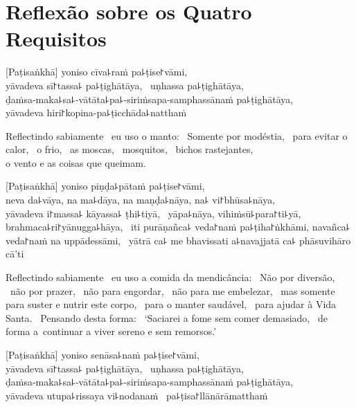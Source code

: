 \chapter[Quatro Requisitos]{Reflexão sobre os Quatro Requisitos}


\begin{leader}
\end{leader}

[Paṭisaṅkhā] yoniso cīva꜕raṁ pa꜕ṭise꜓vāmi, \pause\\
yāvadeva sī꜓tassa꜕ pa꜕ṭighātāya, \pause\ uṇhassa pa꜕ṭighātāya, \pause\\
ḍaṁsa-maka꜕sa꜕-vātāta꜕pa꜕-siriṁsapa-samphassānaṁ pa꜕ṭighātāya, \pause\\
yāvadeva hiri꜓kopina-pa꜕ṭicchāda꜕natthaṁ

\begin{english}
  Reflectindo sabiamente \pause\ eu uso o manto: \pause\ Somente por modéstia, \pause\
  para evitar o calor, \pause\ o frio, \pause\ as moscas, \pause\ mosquitos,
  \pause\ bichos rastejantes, \pause\\ o vento e as coisas que queimam.
\end{english}

[Paṭisaṅkhā] yoniso piṇḍa꜕pātaṁ pa꜕ṭise꜓vāmi, \pause\\
neva da꜕vāya, na ma꜕dāya, na maṇḍa꜕nāya, na꜕ vi꜓bhūsa꜕nāya, \pause\\
yāvadeva i꜓massa꜕ kāyassa꜕ ṭhi꜕tiyā, \pause\ yāpa꜕nāya, vihiṁsū꜕para꜓ti꜕yā, \pause\\
brahmaca꜕ri꜓yānugga꜕hāya, \pause\ iti purāṇañca꜕ veda꜓naṁ pa꜕ṭiha꜓ṅkhāmi,
navañca꜕ veda꜓naṁ na uppādessāmi, \pause\ yātrā ca꜕ me bhavissati a꜕navajjatā
ca꜕ phāsuvihāro cā'ti

\begin{english}
  Reflectindo sabiamente \pause\ eu uso a comida da mendicância: \pause\ Não por
  diversão, \pause\ não por prazer, \pause\ não para engordar, \pause\ não para
  me embelezar, \pause\ mas somente para suster e nutrir este corpo, \pause\
  para o manter saudável, \pause\ para ajudar à Vida Santa. \pause\ Pensando
  desta forma: \pause\ `Saciarei a fome sem comer demasiado, \pause\ de
  forma a~continuar a viver sereno e sem remorsos.'
\end{english}

\clearpage

[Paṭisaṅkhā] yoniso senāsa꜕naṁ pa꜕ṭise꜓vāmi, \pause\\
yāvadeva sī꜓tassa꜕ pa꜕ṭighātāya, \pause\ uṇhassa pa꜕ṭighātāya, \pause\\
ḍaṁsa-maka꜕sa꜕-vātāta꜕pa꜕-siriṁsapa-samphassānaṁ pa꜕ṭighātāya, \pause\\
yāvadeva utupa꜕rissaya vi꜕nodanaṁ \pause\ pa꜕ṭisa꜓llānārāmatthaṁ

